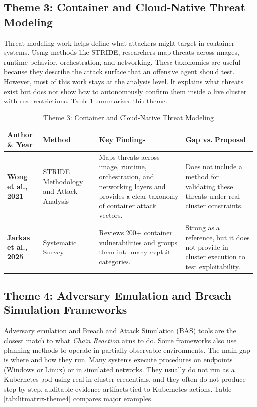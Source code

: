 \documentclass[conference]{IEEEtran}
\begin{document}
\subsection{Theme 3: Container and Cloud-Native Threat Modeling}
Threat modeling work helps define what attackers might target in container systems. Using methods like STRIDE, researchers map threats across images, runtime behavior, orchestration, and networking. These taxonomies are useful because they describe the attack surface that an offensive agent should test. However, most of this work stays at the analysis level. It explains what threats exist but does not show how to autonomously confirm them inside a live cluster with real restrictions. Table \ref{tab:litmatrix-theme3} summarizes this theme.

\begin{table}[t!]
\centering
\caption{Theme 3: Container and Cloud-Native Threat Modeling}
\label{tab:litmatrix-theme3}
\scriptsize
\setlength{\tabcolsep}{5pt}
\renewcommand{\arraystretch}{1.3}
\begin{tabularx}{\textwidth}{l p{2.6cm} X X}
\toprule
\textbf{Author \& Year} & \textbf{Method} & \textbf{Key Findings} & \textbf{Gap vs. Proposal} \\
\midrule
\textbf{Wong et al., 2021} \cite{getahun2021security} & STRIDE Methodology and Attack Analysis & Maps threats across image, runtime, orchestration, and networking layers and provides a clear taxonomy of container attack vectors. & Does not include a method for validating these threats under real cluster constraints. \\
\addlinespace
\textbf{Jarkas et al., 2025} \cite{lin2025container} & Systematic Survey & Reviews 200+ container vulnerabilities and groups them into many exploit categories. & Strong as a reference, but it does not provide in-cluster execution to test exploitability. \\
\bottomrule
\end{tabularx}
\end{table}

\subsection{Theme 4: Adversary Emulation and Breach Simulation Frameworks}
Adversary emulation and Breach and Attack Simulation (BAS) tools are the closest match to what \emph{Chain Reaction} aims to do. Some frameworks also use planning methods to operate in partially observable environments. The main gap is where and how they run. Many systems execute procedures on endpoints (Windows or Linux) or in simulated networks. They usually do not run as a Kubernetes pod using real in-cluster credentials, and they often do not produce step-by-step, auditable evidence artifacts tied to Kubernetes actions. Table \ref{tab:litmatrix-theme4} compares major examples.
\end{document}
